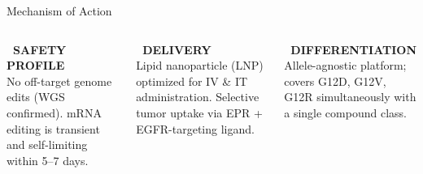 \documentclass[aspectratio=169,10pt]{beamer}
\begin{document}
\begin{frame}{Mechanism of Action}
\begin{columns}[T,onlytextwidth]
    \begin{tcolorbox}[colback=PaperWhite,colframe=TealAccent,arc=3pt,
      boxrule=0.5pt,left=4pt,right=4pt,top=3pt,bottom=3pt]
      {\color{NavyDeep}\tiny\bfseries\faLock\ SAFETY PROFILE}\\[3pt]
      {\tiny No off-target genome edits (WGS confirmed). mRNA editing is
      transient and self-limiting within 5--7 days.}
    \end{tcolorbox}
    \begin{tcolorbox}[colback=PaperWhite,colframe=TealAccent,arc=3pt,
      boxrule=0.5pt,left=4pt,right=4pt,top=3pt,bottom=3pt]
      {\color{NavyDeep}\tiny\bfseries\faCog\ DELIVERY}\\[3pt]
      {\tiny Lipid nanoparticle (LNP) optimized for IV \& IT administration.
      Selective tumor uptake via EPR + EGFR-targeting ligand.}
    \end{tcolorbox}
    \begin{tcolorbox}[colback=PaperWhite,colframe=TealAccent,arc=3pt,
      boxrule=0.5pt,left=4pt,right=4pt,top=3pt,bottom=3pt]
      {\color{NavyDeep}\tiny\bfseries\faChartBar\ DIFFERENTIATION}\\[3pt]
      {\tiny Allele-agnostic platform; covers G12D, G12V, G12R simultaneously
      with a single compound class.}
    \end{tcolorbox}
  \end{columns}
\end{frame}
\end{document}
